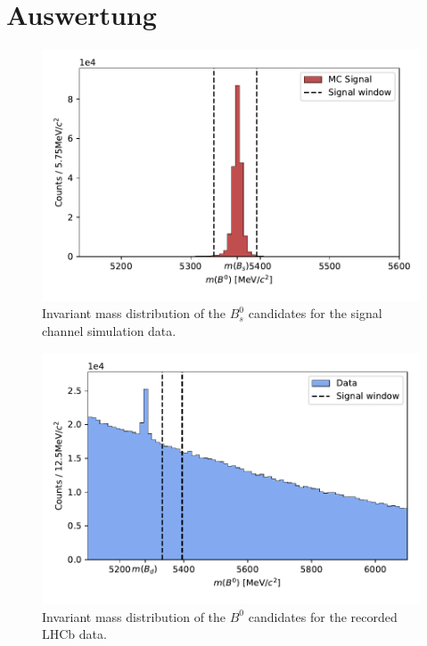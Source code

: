 \section{Auswertung}
\label{sec:Auswertung}

\begin{figure}
  \centering
  \includegraphics[width = .8\textwidth]{"content/plots/mass_signal.pdf"}
  \caption{Invariant mass distribution of the $B^0_s$ candidates for the signal channel simulation data.}
  \label{fig:mass_signal}
\end{figure}

\begin{figure}
  \centering
  \includegraphics[width = .8\textwidth]{"content/plots/mass_data.pdf"}
  \caption{Invariant mass distribution of the $B^0$ candidates for the recorded LHCb data.}
  \label{fig:mass_data}
\end{figure}


